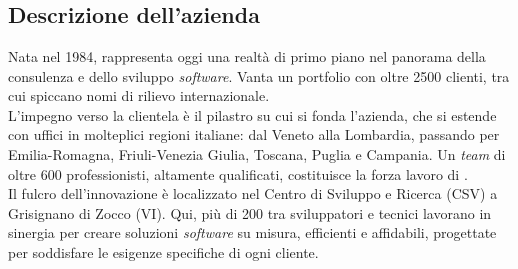 \section{\aziendafull{}}
\subsection{Descrizione dell'azienda}
Nata nel 1984, \aziendafull{} rappresenta oggi una realtà di primo piano nel panorama della consulenza e dello sviluppo \textit{software}. 
Vanta un portfolio con oltre 2500 clienti, tra cui spiccano nomi di rilievo internazionale. \\
L'impegno verso la clientela è il pilastro su cui si fonda l'azienda, che si estende con uffici in molteplici 
regioni italiane: dal Veneto alla Lombardia, passando per Emilia-Romagna, Friuli-Venezia Giulia, Toscana, Puglia e 
Campania. Un \textit{team} di oltre 600 professionisti, altamente qualificati, costituisce la forza lavoro di \azienda. \\
Il fulcro dell'innovazione è localizzato nel Centro di Sviluppo e Ricerca (CSV) a Grisignano di Zocco (VI). 
Qui, più di 200 tra sviluppatori e tecnici lavorano in sinergia per creare soluzioni \textit{software} su misura, 
efficienti e affidabili, progettate per soddisfare le esigenze specifiche di ogni cliente. \\


